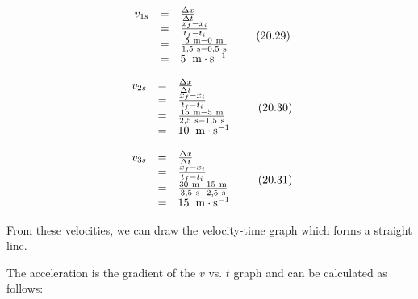     \begin{equation}
    \begin{array}{ccc}\hfill {v}_{1s}& =& \frac{\Delta x}{\Delta t}\hfill \\ & =& \frac{{x}_{f}-{x}_{i}}{{t}_{f}-{t}_{i}}\hfill \\ & =& \frac{5\phantom{\rule{3.33333pt}{0ex}}\mathrm{m}-0\phantom{\rule{3.33333pt}{0ex}}\mathrm{m}}{1,5\phantom{\rule{3.33333pt}{0ex}}\mathrm{s}-0,5\phantom{\rule{3.33333pt}{0ex}}\mathrm{s}}\hfill \\ & =& 5\phantom{\rule{4pt}{0ex}}\phantom{\rule{0.166667em}{0ex}}\mathrm{m}\ensuremath{\cdot}{\mathrm{s}}^{-1}\hfill \end{array}\tag{20.29}
      \end{equation}
          \label{m38795*id72062}\nopagebreak\noindent{}
            
    \begin{equation}
    \begin{array}{ccc}\hfill {v}_{2s}& =& \frac{\Delta x}{\Delta t}\hfill \\ & =& \frac{{x}_{f}-{x}_{i}}{{t}_{f}-{t}_{i}}\hfill \\ & =& \frac{15\phantom{\rule{3.33333pt}{0ex}}\mathrm{m}-5\phantom{\rule{3.33333pt}{0ex}}\mathrm{m}}{2,5\phantom{\rule{3.33333pt}{0ex}}\mathrm{s}-1,5\phantom{\rule{3.33333pt}{0ex}}\mathrm{s}}\hfill \\ & =& 10\phantom{\rule{4pt}{0ex}}\phantom{\rule{0.166667em}{0ex}}\mathrm{m}\ensuremath{\cdot}{\mathrm{s}}^{-1}\hfill \end{array}\tag{20.30}
      \end{equation}
          \label{m38795*id72272}\nopagebreak\noindent{}
            
    \begin{equation}
    \begin{array}{ccc}\hfill {v}_{3s}& =& \frac{\Delta x}{\Delta t}\hfill \\ & =& \frac{{x}_{f}-{x}_{i}}{{t}_{f}-{t}_{i}}\hfill \\ & =& \frac{30\phantom{\rule{3.33333pt}{0ex}}\mathrm{m}-15\phantom{\rule{3.33333pt}{0ex}}\mathrm{m}}{3,5\phantom{\rule{3.33333pt}{0ex}}\mathrm{s}-2,5\phantom{\rule{3.33333pt}{0ex}}\mathrm{s}}\hfill \\ & =& 15\phantom{\rule{4pt}{0ex}}\phantom{\rule{0.166667em}{0ex}}\mathrm{m}\ensuremath{\cdot}{\mathrm{s}}^{-1}\hfill \end{array}\tag{20.31}
      \end{equation}
        \par 
        \label{m38795*id72478}From these velocities, we can draw the velocity-time graph which forms a straight line.\par 
        \label{m38795*id72482}The acceleration is the gradient of the $v$ vs. $t$ graph and can be calculated as follows:\par 
        \label{m38795*id72504}\nopagebreak\noindent{}
          
